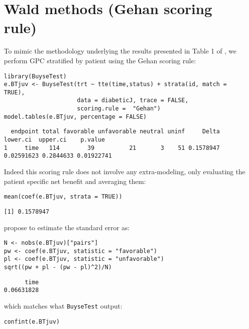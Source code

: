 \documentclass[12pt]{article}
\begin{document}
\clearpage

\section{Wald methods (Gehan scoring rule)}
\label{sec:orgcf5974d}

To mimic the methodology underlying the results presented in Table 1
of \cite{matsouaka2022robust}, we perform GPC stratified by patient
using the Gehan scoring rule:
\lstset{language=r,label= ,caption= ,captionpos=b,numbers=none}
\begin{lstlisting}
library(BuyseTest)
e.BTjuv <- BuyseTest(trt ~ tte(time,status) + strata(id, match = TRUE), 
                     data = diabeticJ, trace = FALSE,
                     scoring.rule =  "Gehan")
model.tables(e.BTjuv, percentage = FALSE)
\end{lstlisting}

\begin{verbatim}
  endpoint total favorable unfavorable neutral uninf     Delta   lower.ci  upper.ci    p.value
1     time   114        39          21       3    51 0.1578947 0.02591623 0.2844633 0.01922741
\end{verbatim}


Indeed this scoring rule does not involve any extra-modeling, only
evaluating the patient specific net benefit and averaging them:
\lstset{language=r,label= ,caption= ,captionpos=b,numbers=none}
\begin{lstlisting}
mean(coef(e.BTjuv, strata = TRUE))
\end{lstlisting}

\begin{verbatim}
[1] 0.1578947
\end{verbatim}


\cite{matsouaka2022robust} propose to estimate the standard error as:
\lstset{language=r,label= ,caption= ,captionpos=b,numbers=none}
\begin{lstlisting}
N <- nobs(e.BTjuv)["pairs"]
pw <- coef(e.BTjuv, statistic = "favorable")
pl <- coef(e.BTjuv, statistic = "unfavorable")
sqrt((pw + pl - (pw - pl)^2)/N)
\end{lstlisting}

\begin{verbatim}
      time 
0.06631828
\end{verbatim}


which matches what \texttt{BuyseTest} output:
\lstset{language=r,label= ,caption= ,captionpos=b,numbers=none}
\begin{lstlisting}
confint(e.BTjuv)
\end{lstlisting}
\end{document}
